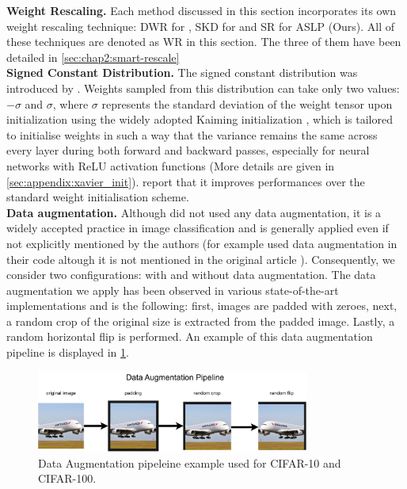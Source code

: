 \noindent\textbf{Weight Rescaling.} Each method discussed in this section
incorporates its own weight rescaling technique: \acf{DWR} for
\cite{DBLP:conf/nips/ZhouLLY19}, \acf{SKD} for
\cite{DBLP:conf/cvpr/RamanujanWKFR20} and \acf{SR} for \ac{ASLP} (Ours). All of
these techniques are denoted as \ac{WR} in this section. The three of them have
been detailed in \cref{sec:chap2:smart-rescale}\\

\noindent\textbf{Signed Constant Distribution.} The signed constant
distribution was introduced by \cite{DBLP:conf/nips/ZhouLLY19}. Weights sampled
from this distribution can take only two values: $-\sigma$ and $\sigma$, where
$\sigma$ represents the standard deviation of the weight tensor upon
initialization using the widely adopted Kaiming initialization
\cite{DBLP:conf/iccv/HeZRS15}, which is tailored to initialise weights in such a
way that the variance remains the same across every layer during both forward
and backward passes, especially for neural networks with \ac{ReLU} activation
functions (More details are given in \cref{sec:appendix:xavier_init}).
\citeauthor{DBLP:conf/nips/ZhouLLY19} report that it improves performances over
the standard weight initialisation scheme.\\

\noindent\textbf{Data augmentation.} Although
\citeauthor{DBLP:conf/nips/ZhouLLY19} \cite{DBLP:conf/nips/ZhouLLY19} did not
used any data augmentation, it is a widely accepted practice in image
classification and is generally applied even if not explicitly mentioned by the
authors (for example \citeauthor{DBLP:conf/cvpr/RamanujanWKFR20} used data
augmentation in their code \cite{hidden-networks} altough it is not mentioned in
the original article \cite{DBLP:conf/cvpr/RamanujanWKFR20}). Consequently, we
consider two configurations: with and without data augmentation. The data
augmentation we apply has been observed in various state-of-the-art
implementations
\cite{hidden-networks,openlth_dataaugmentation,rethinking_dataaugmentatino} and
is the following: first, images are padded with zeroes, next, a random crop of
the original size is extracted from the padded image. Lastly, a random
horizontal flip is performed. An example of this data augmentation pipeline is
displayed in \cref{fig:chap2:data_augmentation_pipeline}.\\

\begin{figure}[h!]
  \centering
  \includegraphics[width=0.8\textwidth]{chapter_2/assets/data_augmentation_pipeline.pdf}
  \caption{Data Augmentation pipeleine example used for CIFAR-10 and CIFAR-100.}
  \label{fig:chap2:data_augmentation_pipeline}
\end{figure}

